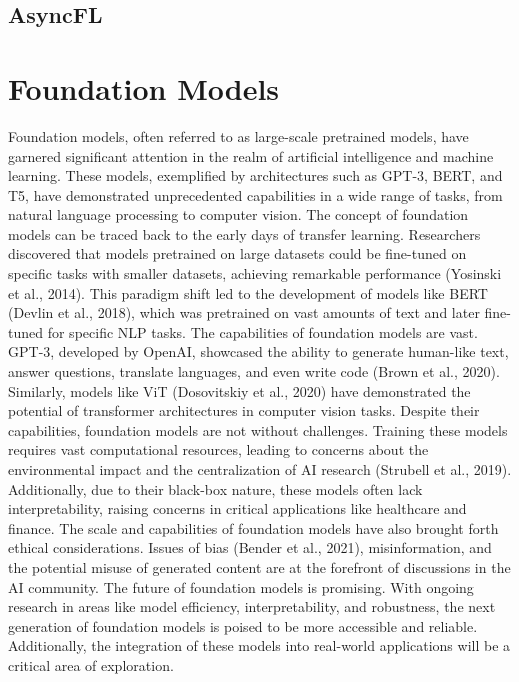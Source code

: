 \documentclass[withindex,glossary]{cam-thesis}
\begin{document}
\subsection{AsyncFL}


 
\section{Foundation Models}

Foundation models, often referred to as large-scale pretrained models, have garnered significant attention in the realm of artificial intelligence and machine learning. These models, exemplified by architectures such as GPT-3, BERT, and T5, have demonstrated unprecedented capabilities in a wide range of tasks, from natural language processing to computer vision.
The concept of foundation models can be traced back to the early days of transfer learning. Researchers discovered that models pretrained on large datasets could be fine-tuned on specific tasks with smaller datasets, achieving remarkable performance (Yosinski et al., 2014). This paradigm shift led to the development of models like BERT (Devlin et al., 2018), which was pretrained on vast amounts of text and later fine-tuned for specific NLP tasks.
The capabilities of foundation models are vast. GPT-3, developed by OpenAI, showcased the ability to generate human-like text, answer questions, translate languages, and even write code (Brown et al., 2020). Similarly, models like ViT (Dosovitskiy et al., 2020) have demonstrated the potential of transformer architectures in computer vision tasks.
Despite their capabilities, foundation models are not without challenges. Training these models requires vast computational resources, leading to concerns about the environmental impact and the centralization of AI research (Strubell et al., 2019). Additionally, due to their black-box nature, these models often lack interpretability, raising concerns in critical applications like healthcare and finance.
The scale and capabilities of foundation models have also brought forth ethical considerations. Issues of bias (Bender et al., 2021), misinformation, and the potential misuse of generated content are at the forefront of discussions in the AI community.
The future of foundation models is promising. With ongoing research in areas like model efficiency, interpretability, and robustness, the next generation of foundation models is poised to be more accessible and reliable. Additionally, the integration of these models into real-world applications will be a critical area of exploration.
\end{document}

